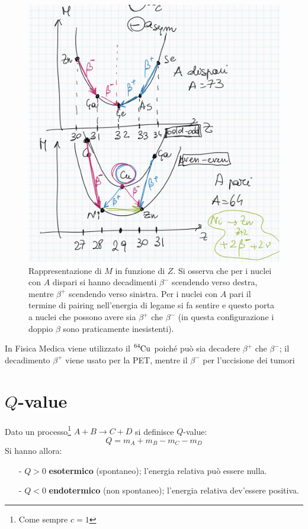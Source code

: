 \begin{figure}[!h]
    \centering
    \includegraphics[scale=0.3]{Immagini/MvsZ.png}
    \caption{Rappresentazione di $M$ in funzione di $Z$. Si osserva che per i nuclei con $A$ dispari si hanno decadimenti $\beta^-$ scendendo verso destra, mentre $\beta^+$ scendendo verso sinistra. Per i nuclei con $A$ pari il termine di pairing nell'energia di legame si fa sentire e questo porta a nuclei che possono avere sia $\beta^+$ che $\beta^-$ (in questa configurazione i doppio $\beta$ sono praticamente inesistenti).}
    \label{MvsZ}
\end{figure}

\begin{curiosita}
In Fisica Medica viene utilizzato il $\ce{^64Cu}$ poiché può sia decadere $\beta^+$ che $\beta^-$; il decadimento $\beta^+$ viene usato per la PET, mentre il $\beta^-$ per l'uccisione dei tumori
\end{curiosita}

\section{$Q$-value}
Dato un processo\footnote{Come sempre $c=1$} $A+B\to C+D$ si definisce $Q$-value:
$$Q = m_A + m_B - m_C - m_D$$
Si hanno allora:
\begin{itemize}
    \item[-] $Q>0$ \textbf{esotermico} (spontaneo); l'energia relativa può essere nulla. 
    \item[-] $Q<0$ \textbf{endotermico} (non spontaneo); l'energia relativa dev'essere positiva.
\end{itemize}
\newpage

